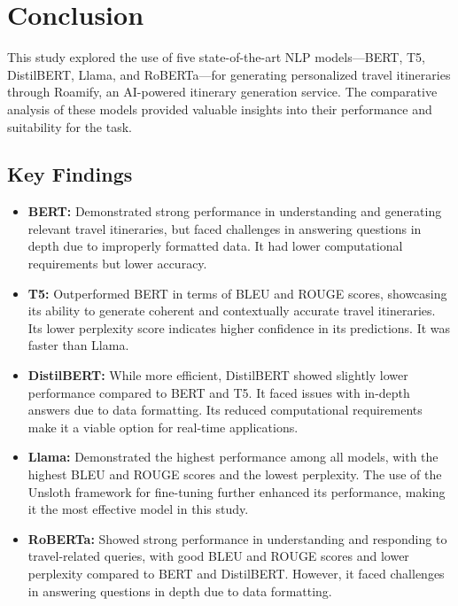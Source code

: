\documentclass[conference]{IEEEtran}
\begin{document}
\section{Conclusion}

    This study explored the use of five state-of-the-art NLP models—BERT, T5, DistilBERT, Llama, and RoBERTa—for generating personalized travel itineraries through Roamify, an AI-powered itinerary generation service. The comparative analysis of these models provided valuable insights into their performance and suitability for the task.

    \subsection{Key Findings}

        \begin{itemize}
            \item \textbf{BERT:} Demonstrated strong performance in understanding and generating relevant travel itineraries, but faced challenges in answering questions in depth due to improperly formatted data. It had lower computational requirements but lower accuracy.
            \item \textbf{T5:} Outperformed BERT in terms of BLEU and ROUGE scores, showcasing its ability to generate coherent and contextually accurate travel itineraries. Its lower perplexity score indicates higher confidence in its predictions. It was faster than Llama.
            \item \textbf{DistilBERT:} While more efficient, DistilBERT showed slightly lower performance compared to BERT and T5. It faced issues with in-depth answers due to data formatting. Its reduced computational requirements make it a viable option for real-time applications.
            \item \textbf{Llama:} Demonstrated the highest performance among all models, with the highest BLEU and ROUGE scores and the lowest perplexity. The use of the Unsloth framework for fine-tuning further enhanced its performance, making it the most effective model in this study.
            \item \textbf{RoBERTa:} Showed strong performance in understanding and responding to travel-related queries, with good BLEU and ROUGE scores and lower perplexity compared to BERT and DistilBERT. However, it faced challenges in answering questions in depth due to data formatting.
        \end{itemize}
\end{document}

